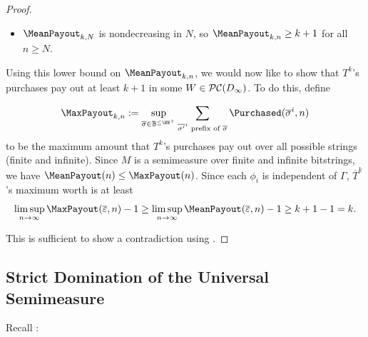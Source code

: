 \documentclass[authordate,onecolumn,noenvironments]{miri-tech-article}
\numberwithin{equation}{subsection}
\newcommand{\seq}[1]{{\overline{#1}}}
\newcommand{\nn}{n}
\newcommand{\trade}{T}%
\newcommand{\Trader}{\seq{\trade}} %
\newcommand{\BelState}{\mathbb{P}}
\newcommand{\pt}{\BelState}
\newcommand{\dt}{D}
\newcommand{\pcworlds}{\mathcal{P\-C}}
\newcommand{\Theory}{\Gamma}
\begin{document}
\begin{proof}
\begin{itemize}
For all sufficiently high $n$ we have $A(\seq{\sigma}^i, n) \geq M(\seq{\sigma}^i)/2$, so for all sufficiently high
$n \in \mathcal{N}$,

\[ \frac{\pt_n(\phi_i)}{A(\seq{\sigma}^i,n)} \leq \frac{\pt_n(\phi_i)}{M(\seq{\sigma}^i)/2} \leq \frac{1}{4(k+1)}  \]

and so there is some infinite subset $\mathcal{N}' \subseteq \mathcal{N}$ for which $\alpha_{k,n,i} = 1$.
By assumption, $\forall n: \MeanPayout_{k, n} < k+1$, so the trader never has spent more than $\$1/2$ (using the previous step), so $\gamma_{k,n,i} \leq 1/2$.
This means $\beta_{k,n,i} \geq 1/2$, which implies an increase in mean payout $\MeanPayout_{k,n} - \MeanPayout_{k,n-1} \geq M(\seq{\sigma}^i) > 0$.  But this increase happens for infinitely many $n$,
so $\lim_{n \to \infty} \MeanPayout_{k, n} = \infty$.  This contradicts the assumption that $\MeanPayout_{k, N} < k+1$ for all $N$.
  \item $\MeanPayout_{k,N}$ is nondecreasing in $N$, so $\MeanPayout_{k,n} \geq k+1$ for all $n \geq N$.
\end{itemize}

Using this lower bound on $\MeanPayout_{k,n}$, we would now like to show that $T^k$'s purchases pay out at least $k+1$ in some $W \in \pcworlds(\dt_\infty)$. To do this, define

\[
\MaxPayout_{k,n} := \sup_{\seq{\sigma} \in \mathbb{B}^{\leq \NN^+}} \sum_{\seq{\sigma'}^i \text{~prefix of~} \seq{\sigma}} \Purchased(\seq{\sigma}^i, \nn)
\]
to be the maximum amount that $T^k$'s purchases pay out over all possible strings (finite and infinite).
Since $M$ is a semimeasure over finite and infinite bitstrings, we have $\MeanPayout(\nn) \leq \MaxPayout(\nn)$.
Since each $\phi_i$ is independent of $\Theory$, $\Trader^k$'s maximum worth is at least
\[ \limsup_{\nn \to \infty} \MaxPayout(\seq{\varepsilon}, \nn) - 1 \geq \limsup_{\nn \to \infty} \MeanPayout(\seq{\varepsilon}, \nn) - 1 \geq k + 1 - 1 = k. \]

This is sufficient to show a contradiction using .
\end{proof}

\subsection{Strict Domination of the Universal Semimeasure}\label{app:strict}

Recall :

\restatestrict*
\end{document}
